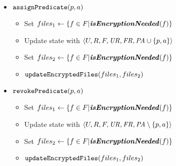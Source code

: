{\begin{itemize}
        \item \( \mathtt{assignPredicate}(p, a) \)
        \begin{itemize}
            \item Set \( files_1 \leftarrow \lbrace f \in F \vert \textbf{\textit{isEncryptionNeeded}}(f) \rbrace \)
            \item Update state with \( \langle U, \allowbreak R, \allowbreak F, \allowbreak \mathit{UR}, \allowbreak \mathit{FR}, \allowbreak \mathit{PA} \cup \lbrace p, a \rbrace \rangle \)
            \item Set \( files_2 \leftarrow \lbrace f \in F \vert \textbf{\textit{isEncryptionNeeded}}(f) \rbrace \)
            \item \( \mathtt{updateEncryptedFiles}(files_1, files_2) \)
        \end{itemize}

        \item \( \mathtt{revokePredicate}(p, a) \)
        \begin{itemize}
            \item Set \( files_1 \leftarrow \lbrace f \in F \vert \textbf{\textit{isEncryptionNeeded}}(f) \rbrace \)
            \item Update state with \( \langle U, \allowbreak R, \allowbreak F, \allowbreak \mathit{UR}, \allowbreak \mathit{FR}, \allowbreak \mathit{PA} \setminus \lbrace p, a \rbrace \rangle \)
            \item Set \( files_2 \leftarrow \lbrace f \in F \vert \textbf{\textit{isEncryptionNeeded}}(f) \rbrace \)
            \item \( \mathtt{updateEncryptedFiles}(files_1, files_2) \)
        \end{itemize}


    \end{itemize}
}

